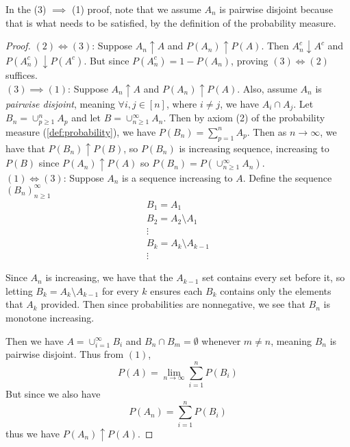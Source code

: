 \documentclass[../main.tex]{subfiles}
\begin{document}
\begin{remark}
In the (3) $\implies$ (1) proof, note that we assume $A_n$ is pairwise disjoint
because that is what needs to be satisfied, by the definition of the probability measure.

\end{remark}

\begin{proof}
$ (2) \iff (3) $: Suppose $A_n \uparrow A$ and $P(A_n) \uparrow P(A)$.
Then $A_n^c \downarrow A^c$ and $P(A^c_n) \downarrow P(A^c)$. But since 
$P(A_n^c) = 1 - P(A_n)$, proving $(3) \iff (2)$ suffices.\\
$(3) \implies (1) $: Suppose $A_n \uparrow A$ and $P(A_n) \uparrow P(A)$. Also, assume 
$A_n$ is \textit{pairwise disjoint}, meaning $\forall i,j \in [n]$, where $i\neq j$, we have $A_i \cap A_j$.
Let $B_n = \cup^n_{p\geq 1}{A_p}$ and let $B = \cup^\infty_{n\geq 1}{A_n}$.
Then by axiom (2) of the probability measure (\ref{def:probability}), we have
$P(B_n) = \sum^n_{p=1}{A_p}$. Then as $n \to \infty$, we have that $P(B_n)\uparrow P(B)$, so $P(B_n)$ is
increasing sequence, increasing to $P(B)$ since $P(A_n) \uparrow P(A)$ so $P(B_n) = P(\cup^\infty_{n\geq 1}{A_n})$.\\
$ (1) \iff (3) $: Suppose $A_n$ is a sequence increasing to $A$. Define the sequence $(B_n)^\infty_{n\geq 1}$
\begin{gather*}
    B_1 = A_1 \\
    B_2 = A_2 \setminus A_1 \\
     \vdots \\
    B_k = A_k \setminus A_{k-1} \\
     \vdots 
\end{gather*}
\begin{remark} Since $A_n$ is increasing, we have that the $A_{k-1}$ set contains every
set before it, so letting $B_k = A_k \setminus A_{k-1}$ for every $k$ 
ensures each $B_k$ contains only the elements that $A_k$ provided. Then since probabilities are nonnegative, 
we see that $B_n$ is monotone increasing.
\end{remark}
Then we have $A= \cup^\infty_{i=1}{B_i}$ and $B_n \cap B_m = \emptyset$
whenever $m \neq n$, meaning $B_n$ is pairwise disjoint. Thus from $(1)$,\[
P(A) = \lim_{n\to\infty}{\sum^n_{i=1}{P(B_i)}}
\]
But since we also have \[
P(A_n) = \sum^n_{i=1}{P(B_i)}
\]
thus we have $P(A_n) \uparrow P(A)$.
\end{proof}
\end{document}
